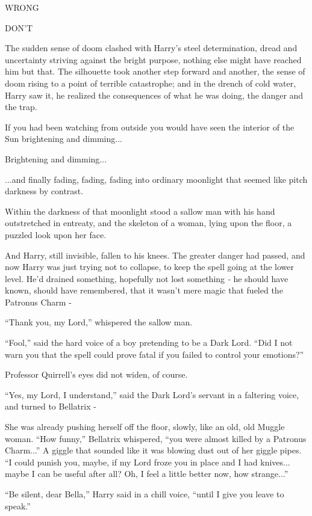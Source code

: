WRONG

DON'T

The sudden sense of doom clashed with Harry's steel determination, dread
and uncertainty striving against the bright purpose, nothing else might
have reached him but that. The silhouette took another step forward and
another, the sense of doom rising to a point of terrible catastrophe;
and in the drench of cold water, Harry saw it, he realized the
consequences of what he was doing, the danger and the trap.

If you had been watching from outside you would have seen the interior
of the Sun brightening and dimming...

Brightening and dimming...

...and finally fading, fading, fading into ordinary moonlight that
seemed like pitch darkness by contrast.

Within the darkness of that moonlight stood a sallow man with his hand
outstretched in entreaty, and the skeleton of a woman, lying upon the
floor, a puzzled look upon her face.

And Harry, still invisible, fallen to his knees. The greater danger had
passed, and now Harry was just trying not to collapse, to keep the spell
going at the lower level. He'd drained something, hopefully not lost
something \emph{-} he should have known, should have remembered, that it
wasn't mere magic that fueled the Patronus Charm -

``Thank you, my Lord,'' whispered the sallow man.

``Fool,'' said the hard voice of a boy pretending to be a Dark Lord.
``Did I not warn you that the spell could prove fatal if you failed to
control your emotions?''

Professor Quirrell's eyes did not widen, of course.

``Yes, my Lord, I understand,'' said the Dark Lord's servant in a
faltering voice, and turned to Bellatrix -

She was already pushing herself off the floor, slowly, like an old, old
Muggle woman. ``How funny,'' Bellatrix whispered, ``you were almost
killed by a Patronus Charm...'' A giggle that sounded like it was
blowing dust out of her giggle pipes. ``I could punish you, maybe, if my
Lord froze you in place and I had knives... maybe I can be useful
after all? Oh, I feel a little better now, how strange...''

``Be silent, dear Bella,'' Harry said in a chill voice, ``until I give
you leave to speak.''

